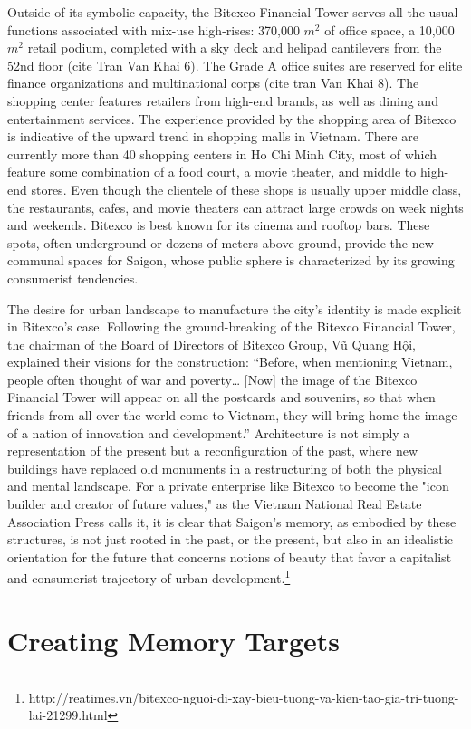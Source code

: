 Outside of its symbolic capacity, the Bitexco Financial Tower serves all the usual functions associated with mix-use high-rises: 370,000 $m^2$ of office space, a 10,000 $m^2$ retail podium, completed with a sky deck and helipad cantilevers from the 52nd floor (cite Tran Van Khai 6). The Grade A office suites are reserved for elite finance organizations and multinational corps (cite tran Van Khai 8). The shopping center features retailers from high-end brands, as well as dining and entertainment services.  The experience provided by the shopping area of Bitexco is indicative of the upward trend in shopping malls in Vietnam. There are currently more than 40 shopping centers in Ho Chi Minh City, most of which feature some combination of a food court, a movie theater, and middle to high-end stores.  Even though the clientele of these shops is usually upper middle class, the restaurants, cafes, and movie theaters can attract large crowds on week nights and weekends. Bitexco is best known for its cinema and rooftop bars. These spots, often underground or dozens of meters above ground, provide the new communal spaces for Saigon, whose public sphere is characterized by its growing consumerist tendencies.

The desire for urban landscape to manufacture the city's identity is made explicit in Bitexco’s case. Following the ground-breaking of the Bitexco Financial Tower, the chairman of the Board of Directors of Bitexco Group, Vũ Quang Hội, explained their visions for the construction: “Before, when mentioning Vietnam, people often thought of war and poverty… [Now] the image of the Bitexco Financial Tower will appear on all the postcards and souvenirs, so that when friends from all over the world come to Vietnam, they will bring home the image of a nation of innovation and development.” Architecture is not simply a representation of the present but a reconfiguration of the past, where new buildings have replaced old monuments in a restructuring of both the physical and mental landscape. For a private enterprise like Bitexco to become the "icon builder and creator of future values," as the Vietnam National Real Estate Association Press calls it, it is clear that Saigon's memory, as embodied by these structures, is not just rooted in the past, or the present, but also in an idealistic orientation for the future that concerns notions of beauty that favor a capitalist and consumerist trajectory of urban development.\footnote{http://reatimes.vn/bitexco-nguoi-di-xay-bieu-tuong-va-kien-tao-gia-tri-tuong-lai-21299.html} %

\section{Creating Memory Targets}
\en
